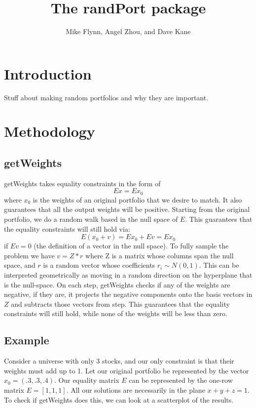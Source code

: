 \documentclass{article}\usepackage{graphicx, color}
\begin{document}
\title{The randPort package}
\author{Mike Flynn, Angel Zhou, and Dave Kane}
\maketitle

\section*{Introduction}

Stuff about making random portfolios and why they are important.

\section*{Methodology}

\subsection*{getWeights}

getWeights takes equality constraints in the form of $$ E x = E
x_0$$ where $x_0$ is the weights of an original portfolio that we
desire to match. It also guarantees that all the output weights will
be positive. Starting from the original portfolio, we do a random walk
based in the null space of $E$. This guarantees that the equality
constraints will still hold via:$$ E(x_0 + v) = Ex_0 + Ev = Ex_0$$ if
$Ev = 0$ (the definition of a vector in the null space). To fully
sample the problem we have $v = Z*r$ where Z is a matrix whose columns
span the null space, and $r$ is a random vector whose coefficients
$r_i \sim N(0, 1)$. This can be interpreted geometrically as moving in
a random direction on the hyperplane that is the null-space. On each
step, getWeights checks if any of the weights are negative, if
they are, it projects the negative components onto the basis vectors
in $Z$ and subtracts those vectors from step. This guarantees that the
equality constraints will still hold, while none of the weights will
be less than zero.

\subsection*{Example}

Consider a universe with only 3 stocks, and our only constraint is
that their weights must add up to 1. Let our original portfolio be
represented by the vector $x_0 = (.3, .3, .4)$. Our equality matrix $E$
can be represented by the one-row matrix $E = [1,1,1]$. All our
solutions are necessarily in the plane $x + y + z = 1$. To check if
getWeights does this, we can look at a scatterplot of the
results.
\end{document}
